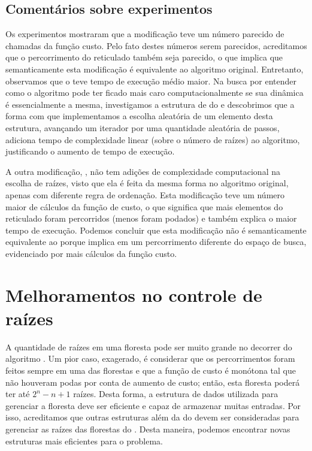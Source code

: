 \subsection{Comentários sobre experimentos}
Os experimentos mostraram que a modificação  teve um
número parecido de chamadas da função custo. Pelo fato destes números
serem parecidos, acreditamos que o percorrimento do reticulado também 
seja parecido, o que implica que semanticamente esta modificação é 
equivalente ao algoritmo original. Entretanto, observamos que o
 teve tempo de execução médio maior. Na busca por
entender como o algoritmo pode ter ficado mais caro computacionalmente
se sua dinâmica é essencialmente a mesma, investigamos a estrutura de
 do  e descobrimos que a forma com que implementamos 
a escolha aleatória de um elemento desta estrutura, avançando um 
iterador por uma quantidade aleatória de passos, adiciona tempo de 
complexidade linear (sobre o número de raízes) ao algoritmo, 
justificando o aumento de tempo de execução.

A outra modificação, , não tem adições de 
complexidade computacional na escolha de raízes, visto que ela é feita
da mesma forma no algoritmo original, apenas com diferente regra de 
ordenação. Esta modificação teve um número maior de cálculos da função
de custo, o que significa que mais elementos do reticulado foram
percorridos (menos foram podados) e também explica o maior tempo de 
execução. Podemos concluir que esta modificação não é semanticamente 
equivalente ao  porque implica em um percorrimento 
diferente do espaço de busca, evidenciado por mais cálculos da função 
custo.


\section{Melhoramentos no controle de raízes}
A quantidade de raízes em uma floresta pode ser muito grande no decorrer 
do algoritmo . Um pior caso, exagerado, é considerar que 
os percorrimentos foram feitos sempre em uma das florestas e que a 
função de custo é monótona tal que não houveram podas por conta de 
aumento de custo; então, esta floresta poderá ter até $2^n - n + 1$ 
raízes. Desta forma, a estrutura de dados utilizada para gerenciar a 
floresta deve ser eficiente e capaz de armazenar muitas entradas.
Por isso, acreditamos que outras estruturas além da  do 
 devem ser consideradas para gerenciar as raízes das 
florestas do . Desta maneira, podemos encontrar novas 
estruturas mais eficientes para o problema.

